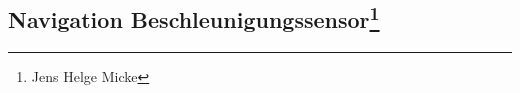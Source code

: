 \subsection[Navigation Beschleunigungssensor]{Navigation Beschleunigungssensor\footnote{Jens Helge Micke}}
\thispagestyle{fancy}
\label{Beschleunigungssensor}